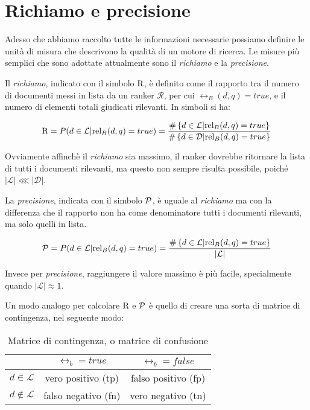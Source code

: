 \section{Richiamo e precisione}

Adesso che abbiamo raccolto tutte le informazioni necessarie possiamo definire
le unità di misura che descrivono la qualità di un motore di ricerca.
Le misure più semplici che sono adottate attualmente sono il \textit{richiamo} e la \textit{precisione}.

\begin{definizione}\label{def:richiamo}
	Il \textit{richiamo}, indicato con il simbolo $\text{R}$, è definito come il rapporto tra il numero di documenti
	messi in lista da  un ranker $\mathcal{R}$, per cui $\rel_B(d,q) = true$,
	e il numero di elementi totali giudicati rilevanti.
	In simboli si ha:
	
	$$
	\text{R} = P(d \in \mathcal{L} | \text{rel}_B(d,q) = true) = \frac{
		\#\left\{ d \in \mathcal{L} | \text{rel}_B(d,q) = true\right\}
	}{
		\#\left\{ d \in \mathcal{D} | \text{rel}_B(d,q) = true\right\}
	}
	$$
\end{definizione}

Ovviamente affinchè il \textit{richiamo} sia massimo, il ranker dovrebbe ritornare la lista di tutti i documenti
rilevanti, ma questo non sempre risulta possibile, poiché $\left|\mathcal{L}\right| \lll \left|\mathcal{D}\right|$.

\begin{definizione}\label{def:precisione}
	La \textit{precisione}, indicata con il simbolo $\mathcal{P}$, è uguale al \textit{richiamo}
	ma con la differenza che il rapporto non ha come denominatore tutti i documenti
	rilevanti, ma solo quelli in lista.
	
	$$
	\mathcal{P} = P(d \in \mathcal{L} | \text{rel}_B(d,q) = true) = \frac{
		\#\left\{ d \in \mathcal{L} | \text{rel}_B(d,q) = true\right\}
	}{
		\left|\mathcal{L}\right|
	}
	$$
\end{definizione}
Invece per \textit{precisione}, raggiungere il valore massimo è più facile, specialmente quando $\left|\mathcal{L}\right| \approx 1$.

\pagebreak

Un modo analogo per calcolare $\text{R}$ e $\mathcal{P}$ è quello di creare una sorta di matrice di contingenza, nel seguente modo:

\begin{table}[h!]
	\centering
	\begin{tabular}{|c|c|c|}
		\hline
		& $\rel_b = true$ & $\rel_b = false$ \\
		\hline
		$d \in \mathcal{L}$ &  vero positivo (tp) & falso positivo (fp) \\
		\hline
		$d \notin \mathcal{L}$ &  falso negativo (fn) & vero negativo (tn) \\
		\hline
	\end{tabular}
	\caption{Matrice di contingenza, o matrice di confusione}
\end{table}

